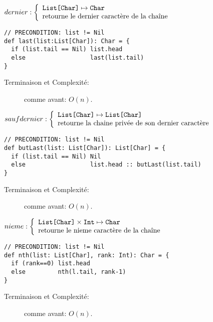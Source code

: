 \documentclass[10pt]{article}\usepackage[nu]{esial}
\begin{document}
\begin{Question}
  $dernier: \left\{
    \begin{array}{l}
      \text{\texttt{List[Char]}}\mapsto \text{\texttt{Char}}\\
      \text{retourne le dernier caractère de la chaîne}
    \end{array}\right.$  
\end{Question}
\begin{Reponse}
  \begin{Verbatim}[]
// PRECONDITION: list != Nil
def last(list:List[Char]): Char = {
  if (list.tail == Nil) list.head
  else                  last(list.tail)
}
  \end{Verbatim}
  \begin{description}
  \item[Terminaison et Complexité:] comme avant: $O(n)$. 
  \end{description}
\end{Reponse}

\begin{Question}
  $saufdernier: \left\{
    \begin{array}{l}
      \text{\texttt{List[Char]}}\mapsto \text{\texttt{List[Char]}}\\
      \text{retourne la chaine privée de son dernier caractère}
    \end{array}\right.$  
\end{Question}
\begin{Reponse}
  \begin{Verbatim}
// PRECONDITION: list != Nil
def butLast(list: List[Char]): List[Char] = {
  if (list.tail == Nil) Nil
  else                  list.head :: butLast(list.tail)
}
  \end{Verbatim}
  \begin{description}
  \item[Terminaison et Complexité:] comme avant: $O(n)$. 
  \end{description}
\end{Reponse}

\begin{Question}
  $nieme: \left\{
    \begin{array}{l}
      \text{\texttt{List[Char]}}\times\text{\texttt{Int}}\mapsto \text{\texttt{Char}}\\
      \text{retourne le nieme caractère de la chaîne}
    \end{array}\right.$  
\end{Question}
\begin{Reponse}
  \begin{Verbatim}
// PRECONDITION: list != Nil
def nth(list: List[Char], rank: Int): Char = {
  if (rank==0) list.head
  else         nth(l.tail, rank-1)
}
  \end{Verbatim}
  \begin{description}
  \item[Terminaison et Complexité:] comme avant: $O(n)$. 
  \end{description}
\end{Reponse}
\end{document}
